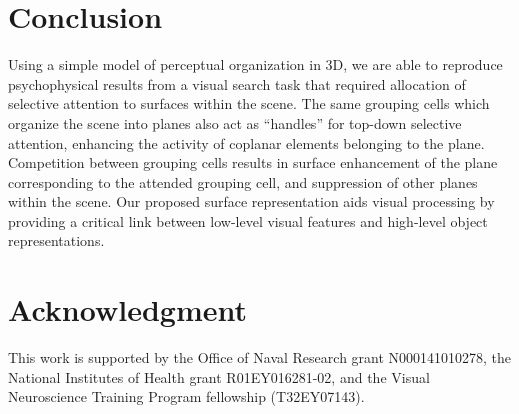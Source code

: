 \documentclass[conference]{IEEEtran}
\begin{document}
\section{Conclusion}
Using a simple model of perceptual organization in 3D,  we are able to reproduce
psychophysical results from a visual search task that required
allocation of selective attention to surfaces within the scene. The
same grouping cells which organize the scene into planes also act as
``handles'' for top-down selective attention, enhancing the activity 
of coplanar elements belonging to the plane. Competition between
grouping cells results in surface enhancement of the plane
corresponding to the attended grouping cell, and suppression of other
planes within the scene. Our proposed surface representation aids
visual processing by providing a critical link between low-level
visual features and high-level object representations. 



\section*{Acknowledgment}
This work is supported by the Office of Naval Research grant
N000141010278, the National Institutes of Health grant
R01EY016281-02, and the Visual Neuroscience Training Program fellowship (T32EY07143). %




%
%
%
\end{document}
